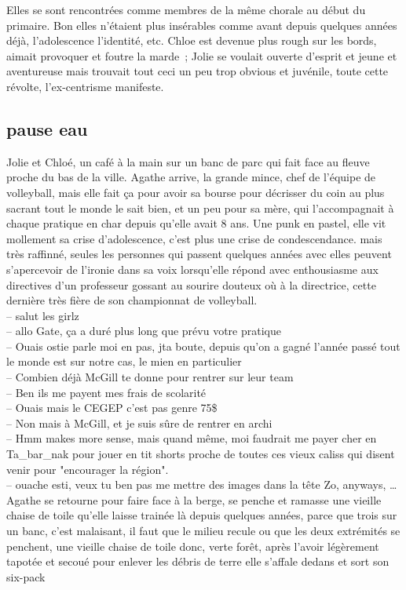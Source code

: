 \documentclass{article}
\begin{document}
Elles se sont rencontrées comme membres de la même chorale au début du
primaire. Bon elles n’étaient plus insérables comme avant depuis quelques
années déjà, l’adolescence l’identité, etc. Chloe est devenue plus rough sur
les bords, aimait provoquer et foutre la marde ; Jolie se voulait ouverte
d’esprit et jeune et aventureuse mais trouvait tout ceci un peu trop obvious et
juvénile, toute cette révolte, l’ex-centrisme manifeste.\\

\clearpage

\subsection{pause eau}

Jolie et Chloé, un café à la main sur un banc de parc qui fait face au fleuve
proche du bas de la ville. Agathe arrive, la grande mince, chef de l'équipe de
volleyball, mais elle fait ça pour avoir sa bourse pour décrisser du coin au
plus sacrant tout le monde le sait bien, et un peu pour sa mère, qui
l'accompagnait à chaque pratique en char depuis qu'elle avait 8 ans. Une punk en
pastel, elle vit mollement sa crise d'adolescence, c'est plus une crise de
condescendance. mais très raffinné, seules les personnes qui passent quelques
années avec elles peuvent s'apercevoir de l'ironie dans sa voix lorsqu'elle
répond avec enthousiasme  aux directives d'un professeur gossant au sourire
douteux où à la directrice, cette dernière très fière de son championnat de
volleyball.\\[1ex]

-- salut les girlz\\
-- allo Gate, ça a duré plus long que prévu votre pratique\\
-- Ouais ostie parle moi en pas, jta boute, depuis qu'on a gagné
l'année passé tout le monde est sur notre cas, le mien en particulier\\
-- Combien déjà McGill te donne pour rentrer sur leur team \\
-- Ben ils me payent mes frais de scolarité\\
-- Ouais mais le CEGEP c'est pas genre 75\$\\
-- Non mais à McGill, et je suis sûre de rentrer en archi\\
-- Hmm makes more sense, mais quand même, moi faudrait me payer
cher en Ta\_bar\_nak pour jouer en tit shorts proche de toutes ces vieux caliss
qui disent venir pour "encourager la région". \\
-- ouache esti, veux tu ben pas me mettre des images dans la tête Zo,
anyways, \ldots \\[1ex]
Agathe se retourne pour faire face à la berge, se penche et ramasse une
vieille chaise de toile qu'elle laisse trainée là depuis quelques années,
parce que trois sur un banc, c'est malaisant, il faut que le milieu recule
ou que les deux extrémités se penchent, une vieille chaise de toile donc,
verte forêt, après l'avoir légèrement tapotée et secoué pour enlever les débris
de terre elle s'affale dedans et sort son six-pack
\end{document}
